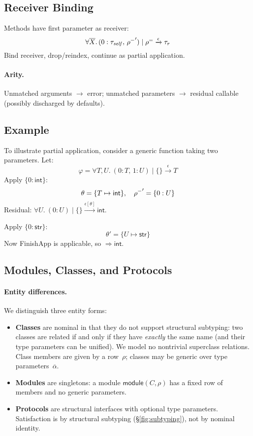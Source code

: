 \subsection{Receiver Binding}
\label{sec:receiver-binding}
Methods have first parameter as receiver:
\[
\forall \overline{X}.\,(0:\tau_{\mathit{self}},\,\mathord{\rho^{-}}') \mid \mathord{\rho^{=}} \xrightarrow{\epsilon} \tau_r
\]
Bind receiver, drop/reindex, continue as partial application.

\paragraph{Arity.}
Unmatched arguments $\to$ error; unmatched parameters $\to$ residual callable (possibly discharged by defaults).

\subsection{Example}
To illustrate partial application, consider a generic function taking two parameters. Let:
\[
\varphi = \forall T,U.~(0:T,\,1:U) \mid \{\} \xrightarrow{\epsilon} T
\]
Apply $\{0:\mathsf{int}\}$:
\[
\theta=\{T\mapsto \mathsf{int}\},\quad \mathord{\rho^{-}}'=\{0:U\}
\]
Residual: $\forall U.~(0:U) \mid \{\} \xrightarrow{\epsilon[\theta]} \mathsf{int}$.

Apply $\{0:\mathsf{str}\}$:
\[
\theta'=\{U\mapsto \mathsf{str}\}
\]
Now \textsf{FinishApp} is applicable, so $\Rightarrow \mathsf{int}$.

\subsection{Modules, Classes, and Protocols}
\label{sec:modules-classes-protocols}

\paragraph{Entity differences.}
We distinguish three entity forms:
\begin{itemize}
    \item \textbf{Classes} are nominal in that they do not support structural subtyping: two classes are related if and only if they have \emph{exactly} the same name (and their type parameters can be unified). We model no nontrivial superclass relations. Class members are given by a row~$\rho$; classes may be generic over type parameters~$\overline{\alpha}$.
    \item \textbf{Modules} are singletons: a module $\mathsf{module}(C, \rho)$ has a fixed row of members and no generic parameters.
    \item \textbf{Protocols} are structural interfaces with optional type parameters. Satisfaction is by structural subtyping (\S\ref{fig:subtyping}), not by nominal identity.
\end{itemize}

